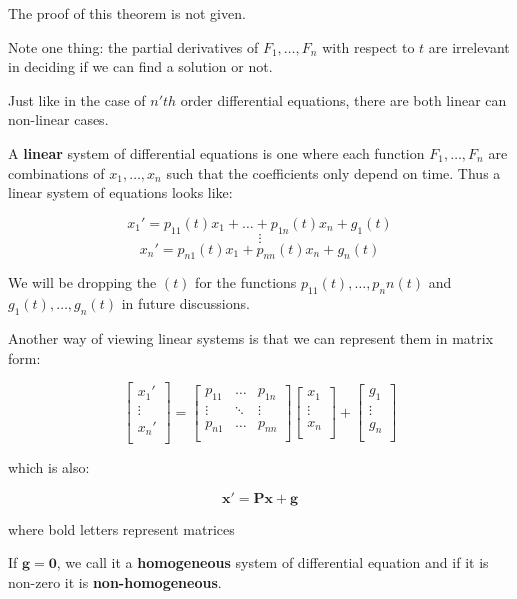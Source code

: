 \documentclass{report}
\begin{document}
The proof of this theorem is not given.

Note one thing: the partial derivatives of $F_1, \dots, F_n$ with respect to $t$ are irrelevant in deciding if we can find a solution or not.


Just like in the case of $n'th$ order differential equations, there are both linear can non-linear cases.

A \textbf{linear} system of differential equations is one where each function $F_1, \dots, F_n$ are combinations of $x_1, \dots, x_n$ such that the coefficients only depend on time. Thus a linear system of equations looks like:


$$x_1' = p_{11}(t)x_1 + \dots + p_{1n}(t)x_n +g_1(t)$$
$$\vdots$$
$$x_n' = p_{n1}(t)x_1 + p_{nn}(t)x_n + g_n(t)$$

We will be dropping the $(t)$ for the functions $p_11(t), \dots, p_nn(t)$ and $g_1(t), \dots, g_n(t)$ in future discussions.

Another way of viewing linear systems is that we can represent them in matrix form:


$$
\begin{bmatrix}
    x_1' \\
    \vdots \\
    x_n' \\
\end{bmatrix}
=
\begin{bmatrix}
    p_{11} &  \dots & p_{1n} \\
    \vdots & \ddots & \vdots \\
    p_{n1} &  \dots & p_{nn} \\
\end{bmatrix}
\begin{bmatrix}
    x_1 \\
    \vdots \\
    x_n \\
\end{bmatrix}
+
\begin{bmatrix}
    g_1 \\
    \vdots \\
    g_n \\
\end{bmatrix}
$$

which is also:

$$\mathbf{x}' = \mathbf{Px} + \mathbf{g}$$

where bold letters represent matrices

If $\mathbf{g} = \mathbf{0}$, we call it a \textbf{homogeneous} system of differential equation and if it is non-zero it is \textbf{non-homogeneous}.
\end{document}
